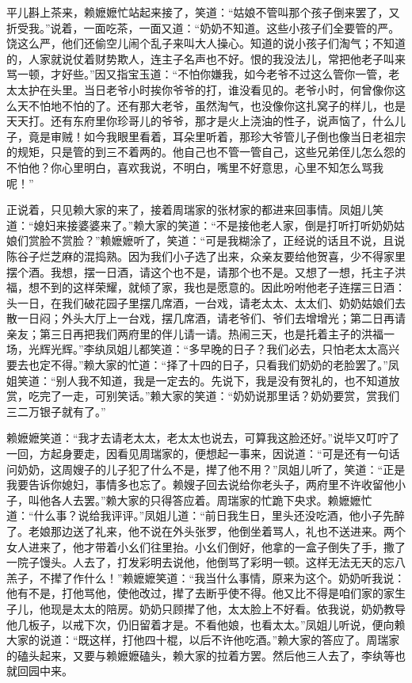 平儿斟上茶来，赖嬷嬷忙站起来接了，笑道：``姑娘不管叫那个孩子倒来罢了，又折受我。''说着，一面吃茶，一面又道：``奶奶不知道。这些小孩子们全要管的严。饶这么严，他们还偷空儿闹个乱子来叫大人操心。知道的说小孩子们淘气；不知道的，人家就说仗着财势欺人，连主子名声也不好。恨的我没法儿，常把他老子叫来骂一顿，才好些。''因又指宝玉道：``不怕你嫌我，如今老爷不过这么管你一管，老太太护在头里。当日老爷小时挨你爷爷的打，谁没看见的。老爷小时，何曾像你这么天不怕地不怕的了。还有那大老爷，虽然淘气，也没像你这扎窝子的样儿，也是天天打。还有东府里你珍哥儿的爷爷，那才是火上浇油的性子，说声恼了，什么儿子，竟是审贼！如今我眼里看着，耳朵里听着，那珍大爷管儿子倒也像当日老祖宗的规矩，只是管的到三不着两的。他自己也不管一管自己，这些兄弟侄儿怎么怨的不怕他？你心里明白，喜欢我说，不明白，嘴里不好意思，心里不知怎么骂我呢！''

正说着，只见赖大家的来了，接着周瑞家的张材家的都进来回事情。凤姐儿笑道：``媳妇来接婆婆来了。''赖大家的笑道：``不是接他老人家，倒是打听打听奶奶姑娘们赏脸不赏脸？''赖嬷嬷听了，笑道：``可是我糊涂了，正经说的话且不说，且说陈谷子烂芝麻的混捣熟。因为我们小子选了出来，众亲友要给他贺喜，少不得家里摆个酒。我想，摆一日酒，请这个也不是，请那个也不是。又想了一想，托主子洪福，想不到的这样荣耀，就倾了家，我也是愿意的。因此吩咐他老子连摆三日酒：头一日，在我们破花园子里摆几席酒，一台戏，请老太太、太太们、奶奶姑娘们去散一日闷；外头大厅上一台戏，摆几席酒，请老爷们、爷们去增增光；第二日再请亲友；第三日再把我们两府里的伴儿请一请。热闹三天，也是托着主子的洪福一场，光辉光辉。''李纨凤姐儿都笑道：``多早晚的日子？我们必去，只怕老太太高兴要去也定不得。''赖大家的忙道：``择了十四的日子，只看我们奶奶的老脸罢了。''凤姐笑道：``别人我不知道，我是一定去的。先说下，我是没有贺礼的，也不知道放赏，吃完了一走，可别笑话。''赖大家的笑道：``奶奶说那里话？奶奶要赏，赏我们三二万银子就有了。''

赖嬷嬷笑道：``我才去请老太太，老太太也说去，可算我这脸还好。''说毕又叮咛了一回，方起身要走，因看见周瑞家的，便想起一事来，因说道：``可是还有一句话问奶奶，这周嫂子的儿子犯了什么不是，撵了他不用？''凤姐儿听了，笑道：``正是我要告诉你媳妇，事情多也忘了。赖嫂子回去说给你老头子，两府里不许收留他小子，叫他各人去罢。''赖大家的只得答应着。周瑞家的忙跪下央求。赖嬷嬷忙道：``什么事？说给我评评。''凤姐儿道：``前日我生日，里头还没吃酒，他小子先醉了。老娘那边送了礼来，他不说在外头张罗，他倒坐着骂人，礼也不送进来。两个女人进来了，他才带着小幺们往里抬。小幺们倒好，他拿的一盒子倒失了手，撒了一院子馒头。人去了，打发彩明去说他，他倒骂了彩明一顿。这样无法无天的忘八羔子，不撵了作什么！''赖嬷嬷笑道：``我当什么事情，原来为这个。奶奶听我说：他有不是，打他骂他，使他改过，撵了去断乎使不得。他又比不得是咱们家的家生子儿，他现是太太的陪房。奶奶只顾撵了他，太太脸上不好看。依我说，奶奶教导他几板子，以戒下次，仍旧留着才是。不看他娘，也看太太。''凤姐儿听说，便向赖大家的说道：``既这样，打他四十棍，以后不许他吃酒。''赖大家的答应了。周瑞家的磕头起来，又要与赖嬷嬷磕头，赖大家的拉着方罢。然后他三人去了，李纨等也就回园中来。


